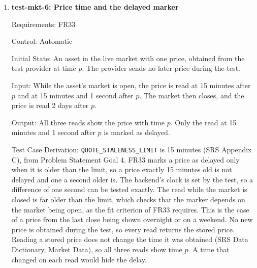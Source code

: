 \documentclass[12pt, titlepage]{article}
\begin{document}
\begin{enumerate}
Output: The prices read are 41.50 and 42.25. After the purchase, the balance
is 958.50, and after the sale, it is 1,000.75, with no shares.

Test Case Derivation: FR32 prices each asset at the latest price from the
provider, and its fit criterion covers both the price shown and the price used
for trades. The price changes before each trade, so a trade or display that
used an old or cached price would give a different result. By the trade rules
in SRS Section 6.7, the purchase gives $1000 - 41.50 = 958.50$ and the sale
gives $958.50 + 42.25 = 1000.75$. Using the old price for the purchase would
leave 960 after it, and using the old price for the sale would leave 1,000.00
at the end.

How test will be performed: A pytest test sets the test provider's prices,
reads each price through the API, sends the two trades, and reads the balance
and holdings after each one.

\item{\textbf{test-mkt-6: Price time and the delayed marker}\\}

Requirements: FR33

Control: Automatic

Initial State: An asset in the live market with one price, obtained from the
test provider at time $p$. The provider sends no later price during the test.

Input: While the asset's market is open, the price is read at 15 minutes
after $p$ and at 15 minutes and 1 second after $p$. The market then closes,
and the price is read 2 days after $p$.

Output: All three reads show the price with time $p$. Only the read at 15
minutes and 1 second after $p$ is marked as delayed.

Test Case Derivation: \texttt{QUOTE\_STALENESS\_LIMIT} is 15 minutes (SRS
Appendix C), from Problem Statement Goal 4. FR33 marks a price as delayed only
when it is older than the limit, so a price exactly 15 minutes old is not
delayed and one a second older is. The backend's clock is set by the test, so
a difference of one second can be tested exactly. The read while the market is
closed is far older than the limit, which checks that the marker depends on
the market being open, as the fit criterion of FR33 requires. This is the case
of a price from the last close being shown overnight or on a weekend. No new
price is obtained during the test, so every read returns the stored price.
Reading a stored price does not change the time it was obtained (SRS Data
Dictionary, Market Data), so all three reads show time $p$. A time that
changed on each read would hide the delay.


\end{enumerate}
\end{document}
